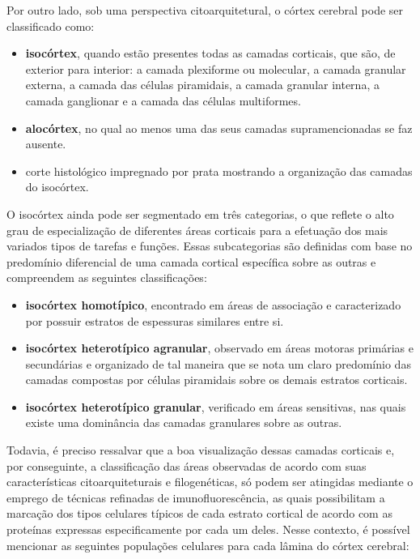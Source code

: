 \documentclass[
]{book}
\providecommand{\tightlist}{%
  \setlength{\itemsep}{0pt}\setlength{\parskip}{0pt}}
\theoremstyle{definition}
\theoremstyle{definition}
\theoremstyle{definition}
\theoremstyle{definition}
\theoremstyle{remark}
\begin{document}
Por outro lado, sob uma perspectiva citoarquitetural, o córtex cerebral pode ser classificado como:

\begin{itemize}
\item
  \textbf{isocórtex}, quando estão presentes todas as camadas corticais, que são, de exterior para interior: a camada plexiforme ou molecular, a camada granular externa, a camada das células piramidais, a camada granular interna, a camada ganglionar e a camada das células multiformes.
\item
  \textbf{alocórtex}, no qual ao menos uma das seus camadas supramencionadas se faz ausente.
\item
  corte histológico impregnado por prata mostrando a organização das camadas do isocórtex.
\end{itemize}

O isocórtex ainda pode ser segmentado em três categorias, o que reflete o alto grau de especialização de diferentes áreas corticais para a efetuação dos mais variados tipos de tarefas e funções. Essas subcategorias são definidas com base no predomínio diferencial de uma camada cortical específica sobre as outras e compreendem as seguintes classificações:

\begin{itemize}
\tightlist
\item
  \textbf{isocórtex homotípico}, encontrado em áreas de associação e caracterizado por possuir estratos de espessuras similares entre si.
\item
  \textbf{isocórtex heterotípico agranular}, observado em áreas motoras primárias e secundárias e organizado de tal maneira que se nota um claro predomínio das camadas compostas por células piramidais sobre os demais estratos corticais.
\item
  \textbf{isocórtex heterotípico granular}, verificado em áreas sensitivas, nas quais existe uma dominância das camadas granulares sobre as outras.
\end{itemize}

Todavia, é preciso ressalvar que a boa visualização dessas camadas corticais e, por conseguinte, a classificação das áreas observadas de acordo com suas características citoarquiteturais e filogenéticas, só podem ser atingidas mediante o emprego de técnicas refinadas de imunofluorescência, as quais possibilitam a marcação dos tipos celulares típicos de cada estrato cortical de acordo com as proteínas expressas especificamente por cada um deles. Nesse contexto, é possível mencionar as seguintes populações celulares para cada lâmina do córtex cerebral:
\end{document}
